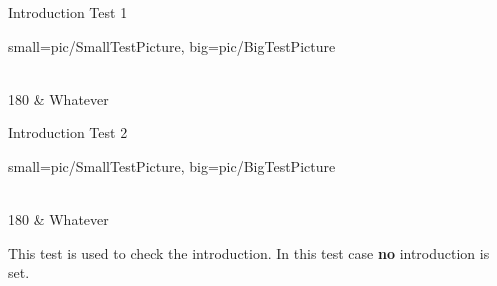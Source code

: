 
\begin{recipe}[
	preparationtime={\unit[\nicefrac{1}{2}]{hour}},
	bakingtime={\unit[1]{hour}},
	source = http://www.ctan.org/pkg/xcookybooky
]{Introduction Test 1}

	\graph
	{%
	    small=pic/SmallTestPicture,
	    big=pic/BigTestPicture
	}
	

	\ingredients
	{%
	    \\
		180  & Whatever
	}
	
	\preparation
	{%
	    \step \lipsum[2]
	    \step \lipsum[4]
	}
	
	\hint
	{%
		\blindtext
	}

\end{recipe}



\newpage



\begin{recipe}[
	preparationtime={\unit[\nicefrac{1}{2}]{hour}},
	bakingtime={\unit[1]{hour}},
	source = http://www.ctan.org/pkg/cookingsymbols
]{Introduction Test 2}

	\graph
	{%
	    small=pic/SmallTestPicture,
	    big=pic/BigTestPicture
	}

	\ingredients
	{%
	    \\
		180  & Whatever
	}
	
	\preparation
	{%
	    \step This test is used to check the introduction. In this test case \textbf{no} introduction is set.
	}
	
\end{recipe}